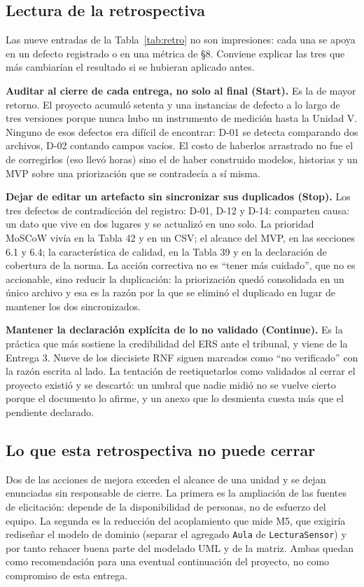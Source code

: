 \subsection{Lectura de la retrospectiva}

Las nueve entradas de la Tabla~\ref{tab:retro} no son impresiones: cada una se apoya en un defecto registrado o en una m\'etrica de \S8. Conviene explicar las tres que m\'as cambiar\'ian el resultado si se hubieran aplicado antes.

\textbf{Auditar al cierre de cada entrega, no solo al final (Start).} Es la de mayor retorno. El proyecto acumul\'o setenta y una instancias de defecto a lo largo de tres versiones porque nunca hubo un instrumento de medici\'on hasta la Unidad V. Ninguno de esos defectos era dif\'icil de encontrar: D-01 se detecta comparando dos archivos, D-02 contando campos vac\'ios. El costo de haberlos arrastrado no fue el de corregirlos (eso llev\'o horas) sino el de haber construido modelos, historias y un MVP sobre una priorizaci\'on que se contradec\'ia a s\'i misma.

\textbf{Dejar de editar un artefacto sin sincronizar sus duplicados (Stop).} Los tres defectos de contradicci\'on del registro: D-01, D-12 y D-14: comparten causa: un dato que vive en dos lugares y se actualiz\'o en uno solo. La prioridad MoSCoW viv\'ia en la Tabla 42 y en un CSV; el alcance del MVP, en las secciones 6.1 y 6.4; la caracter\'istica de calidad, en la Tabla 39 y en la declaraci\'on de cobertura de la norma. La acci\'on correctiva no es ``tener m\'as cuidado'', que no es accionable, sino reducir la duplicaci\'on: la priorizaci\'on qued\'o consolidada en un \'unico archivo y esa es la raz\'on por la que se elimin\'o el duplicado en lugar de mantener los dos sincronizados.

\textbf{Mantener la declaraci\'on expl\'icita de lo no validado (Continue).} Es la pr\'actica que m\'as sostiene la credibilidad del ERS ante el tribunal, y viene de la Entrega 3. Nueve de los diecisiete RNF siguen marcados como ``no verificado'' con la raz\'on escrita al lado. La tentaci\'on de reetiquetarlos como validados al cerrar el proyecto existi\'o y se descart\'o: un umbral que nadie midi\'o no se vuelve cierto porque el documento lo afirme, y un anexo que lo desmienta cuesta m\'as que el pendiente declarado.

\subsection{Lo que esta retrospectiva no puede cerrar}

Dos de las acciones de mejora exceden el alcance de una unidad y se dejan enunciadas sin responsable de cierre. La primera es la ampliaci\'on de las fuentes de elicitaci\'on: depende de la disponibilidad de personas, no de esfuerzo del equipo. La segunda es la reducci\'on del acoplamiento que mide M5, que exigir\'ia rediseñar el modelo de dominio (separar el agregado \texttt{Aula} de \texttt{LecturaSensor}) y por tanto rehacer buena parte del modelado UML y de la matriz. Ambas quedan como recomendaci\'on para una eventual continuaci\'on del proyecto, no como compromiso de esta entrega.
